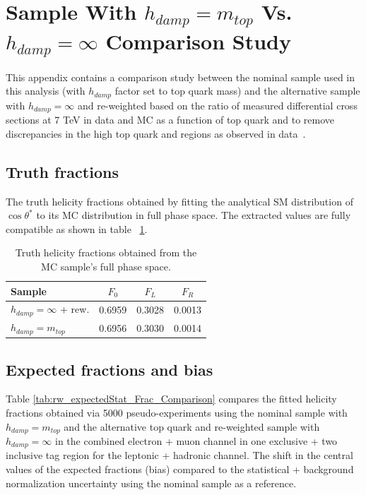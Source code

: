 \clearpage
\section{\ttbar Sample With $h_{damp}=m_{top}$ Vs. $h_{damp}=\infty$ Comparison Study}
\label{app:hdamp_comparison}
This appendix contains a comparison study between the nominal \ttbar sample used in this analysis (with $h_{damp}$ factor set to top quark mass) and the alternative sample with $h_{damp}=\infty$ and re-weighted based on the ratio of measured differential cross sections at 7 TeV in data and MC as a function of top quark \pt and \ttbar \pt to remove discrepancies in the high top quark and \ttbar \pt regions as observed in data~\cite{topdiff_7TEV}.

\subsection{Truth fractions}
The truth helicity fractions obtained by fitting the analytical SM distribution of $\cos\theta^{*}$ to its MC distribution in full phase space. The extracted values are fully compatible as shown in table ~\ref{tab:truthFrac}.

\begin{table}[!hb]
\centering
\begin{tabular}{l|c|c|c}
\hline \hline
Sample  & $F_{0}$ & $F_{L}$ & $F_{R}$ \\ \hline\hline
$h_{damp}=\infty$ + rew. & 0.6959 & 0.3028 & 0.0013 \\
$h_{damp}=m_{top}$ 		 & 0.6956 & 0.3030 & 0.0014 \\ \hline\hline
\end{tabular}
\caption{Truth helicity fractions obtained from the MC sample's full phase space.}
\label{tab:truthFrac}
\end{table}

\subsection{Expected fractions and bias}

Table \ref{tab:rw_expectedStat_Frac_Comparison} compares the fitted helicity fractions obtained via 5000 pseudo-experiments using the nominal \ttbar sample with $h_{damp}=m_{top}$ and the alternative top quark and \ttbar \pt re-weighted sample with $h_{damp}=\infty$ in the combined electron + muon channel in one exclusive + two inclusive \bt tag region for the leptonic + hadronic channel. The shift in the central values of the expected fractions (bias) compared to the statistical + background normalization uncertainty using the nominal \ttbar sample as a reference. 

